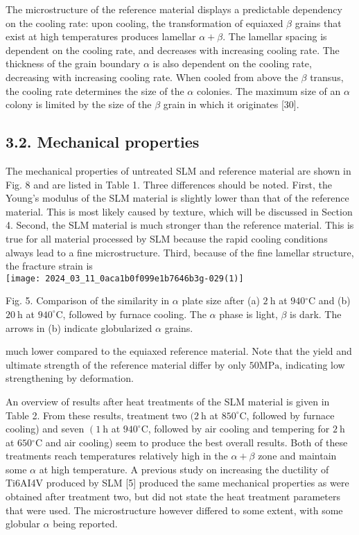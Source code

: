 \documentclass[10pt]{article}
\begin{document}
The microstructure of the reference material displays a predictable dependency on the cooling rate: upon cooling, the transformation of equiaxed $\beta$ grains that exist at high temperatures produces lamellar $\alpha+\beta$. The lamellar spacing is dependent on the cooling rate, and decreases with increasing cooling rate. The thickness of the grain boundary $\alpha$ is also dependent on the cooling rate, decreasing with increasing cooling rate. When cooled from above the $\beta$ transus, the cooling rate determines the size of the $\alpha$ colonies. The maximum size of an $\alpha$ colony is limited by the size of the $\beta$ grain in which it originates [30].

\subsection*{3.2. Mechanical properties}
The mechanical properties of untreated SLM and reference material are shown in Fig. 8 and are listed in Table 1. Three differences should be noted. First, the Young's modulus of the SLM material is slightly lower than that of the reference material. This is most likely caused by texture, which will be discussed in Section 4. Second, the SLM material is much stronger than the reference material. This is true for all material processed by SLM because the rapid cooling conditions always lead to a fine microstructure. Third, because of the fine lamellar structure, the fracture strain is\\
\texttt{[image: 2024\_03\_11\_0aca1b0f099e1b7646b3g-029(1)]}

Fig. 5. Comparison of the similarity in $\alpha$ plate size after (a) $2 \mathrm{~h}$ at $940{ }^{\circ} \mathrm{C}$ and (b) $20 \mathrm{~h}$ at $940^{\circ} \mathrm{C}$, followed by furnace cooling. The $\alpha$ phase is light, $\beta$ is dark. The arrows in (b) indicate globularized $\alpha$ grains.

much lower compared to the equiaxed reference material. Note that the yield and ultimate strength of the reference material differ by only $50 \mathrm{MPa}$, indicating low strengthening by deformation.

An overview of results after heat treatments of the SLM material is given in Table 2. From these results, treatment two $(2 \mathrm{~h}$ at $850^{\circ} \mathrm{C}$, followed by furnace cooling) and seven $\left(1 \mathrm{~h}\right.$ at $940^{\circ} \mathrm{C}$, followed by air cooling and tempering for $2 \mathrm{~h}$ at $650{ }^{\circ} \mathrm{C}$ and air cooling) seem to produce the best overall results. Both of these treatments reach temperatures relatively high in the $\alpha+\beta$ zone and maintain some $\alpha$ at high temperature. A previous study on increasing the ductility of Ti6AI4V produced by SLM [5] produced the same mechanical properties as were obtained after treatment two, but did not state the heat treatment parameters that were used. The microstructure however differed to some extent, with some globular $\alpha$ being reported.
\end{document}
